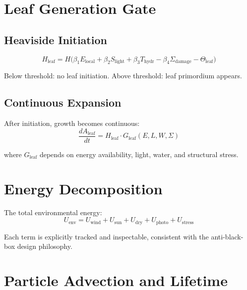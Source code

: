 \documentclass[11pt]{article}
\begin{document}
\section{Leaf Generation Gate}

\subsection{Heaviside Initiation}

\begin{equation}
  H_{\mathrm{leaf}} = H\!\bigl(
    \beta_1 E_{\mathrm{local}} + \beta_2 S_{\mathrm{light}}
    + \beta_3 T_{\mathrm{hydr}} - \beta_4 \Sigma_{\mathrm{damage}}
    - \Theta_{\mathrm{leaf}}
  \bigr)
\end{equation}

Below threshold: no leaf initiation.  Above threshold: leaf primordium
appears.

\subsection{Continuous Expansion}

After initiation, growth becomes continuous:
\begin{equation}
  \frac{dA_{\mathrm{leaf}}}{dt} = H_{\mathrm{leaf}} \cdot
  G_{\mathrm{leaf}}(E, L, W, \Sigma)
\end{equation}

where $G_{\mathrm{leaf}}$ depends on energy availability, light, water,
and structural stress.

\section{Energy Decomposition}

The total environmental energy:
\begin{equation}
  U_{\mathrm{env}} = U_{\mathrm{wind}} + U_{\mathrm{sun}}
    + U_{\mathrm{dry}} + U_{\mathrm{photo}} + U_{\mathrm{stress}}
\end{equation}

Each term is explicitly tracked and inspectable, consistent with the
anti-black-box design philosophy.

\section{Particle Advection and Lifetime}
\end{document}
